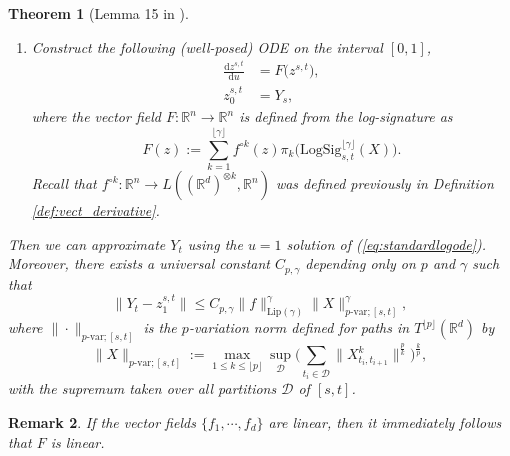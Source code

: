 \documentclass{article}
\def\floor#1{\lfloor #1 \rfloor}
\newcommand{\R}{\mathbb{R}}
\newcommand{\D}{\mathcal{D}}
\newtheorem{theorem}{Theorem}[section]
\newtheorem{remark}[theorem]{Remark}
\newcommand{\logsig}{\mathrm{LogSig}}
\newcommand{\dby}{\mathrm{d}}
\begin{document}
\begin{theorem}[Lemma 15 in \citet{logode2014estimate}]
\begin{enumerate}
\item Construct the following (well-posed) ODE on the interval $[0,1]$,
\begin{align}
\frac{\dby z^{s,t}}{\dby u} & = F\big(z^{s,t}\big),\label{eq:standardlogode}\\
z_0^{s,t} & = Y_s,\nonumber
\end{align}
where the vector field $F:\R^n\rightarrow\R^n$ is defined from the log-signature as
\begin{equation}
F(z) := \sum_{k=1}^{\floor{\gamma}}f^{\circ k}(z)\pi_k\Big(\logsig_{s,t}^{\floor{\gamma}}(X)\Big).
\label{eq:logodevectfield}
\end{equation}
Recall that $f^{\circ k} : \R^n\rightarrow L((\R^d)^{\otimes k}, \R^n)$ was defined previously in Definition \ref{def:vect_derivative}.
\end{enumerate}
Then we can approximate $Y_t$ using the $u = 1$ solution of (\ref{eq:standardlogode}). Moreover, there exists a universal constant $C_{p,\gamma}$ depending only on $p$ and $\gamma$ such that 
\begin{equation}
\big\|Y_t - z_1^{s,t}\big\| \leq C_{p,\gamma}\|f\|_{\mathrm{Lip}(\gamma)}^\gamma\|X\|_{p\text{-var};[s,t]}^\gamma,
\label{eq:local_logodeestimate}
\end{equation}
where $\|\cdot\|_{p\text{-var};[s,t]}$ is the $p$-variation norm defined for paths in $T^{\floor{p}}(\R^d)$ by
\begin{equation}
\|X\|_{p\text{-var};[s,t]} := \max_{1\leq k\leq \floor{p}}\sup_{\D}\bigg(\sum_{t_i\in\D}\big\|X_{t_i, t_{i+1}}^k\big\|^\frac{p}{k}\bigg)^\frac{k}{p},
\label{eq:rpnorm}
\end{equation}
with the supremum taken over all partitions $\D$ of $[s,t]$.
\end{theorem}\medbreak
\begin{remark}
If the vector fields $\{f_1, \cdots, f_d\}$ are linear, then it immediately follows that $F$ is linear.
\end{remark}
\end{document}
